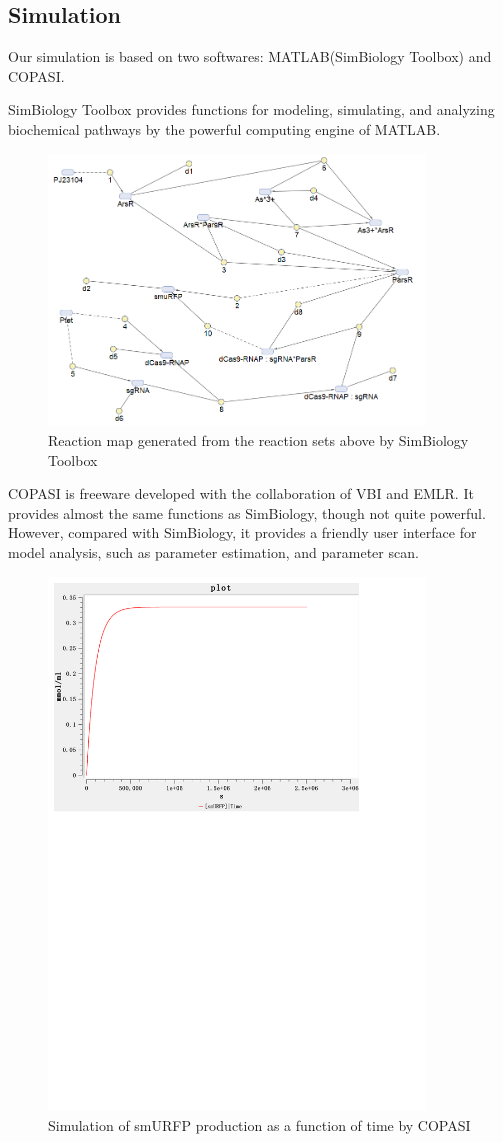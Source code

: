 \subsection{Simulation }
Our simulation is based on two softwares: MATLAB(SimBiology Toolbox) and COPASI.

SimBiology Toolbox provides functions for modeling, simulating, and analyzing biochemical pathways by the powerful computing engine of MATLAB.

\begin{figure}[h]
	\centering
	\includegraphics[width=10cm]{screenshot003}	
	\caption{Reaction map generated from the reaction sets above by SimBiology Toolbox}
\end{figure}

COPASI is freeware developed with the collaboration of VBI and EMLR. It provides almost the same functions as SimBiology, though not quite powerful. However, compared with SimBiology, it provides a friendly user interface for model analysis, such as parameter estimation, and parameter scan.

\begin{figure}[H]
	\centering
	\includegraphics[width=10cm]{smuRFP}
	\caption{Simulation of smURFP production as a function of time by COPASI}
\end{figure}

